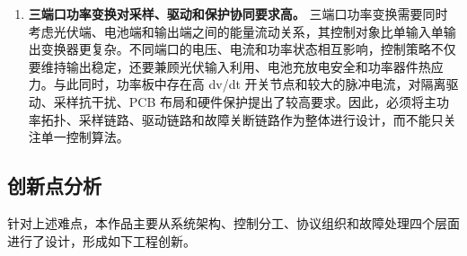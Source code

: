 \begin{enumerate}[label=\arabic*、, leftmargin=*, itemsep=0.8ex, parsep=0pt, topsep=0.5ex]
  \item \textbf{三端口功率变换对采样、驱动和保护协同要求高。}  
  三端口功率变换需要同时考虑光伏端、电池端和输出端之间的能量流动关系，其控制对象比单输入单输出变换器更复杂。不同端口的电压、电流和功率状态相互影响，控制策略不仅要维持输出稳定，还要兼顾光伏输入利用、电池充放电安全和功率器件热应力。与此同时，功率板中存在高 dv/dt 开关节点和较大的脉冲电流，对隔离驱动、采样抗干扰、PCB 布局和硬件保护提出了较高要求。因此，必须将主功率拓扑、采样链路、驱动链路和故障关断链路作为整体进行设计，而不能只关注单一控制算法。
\end{enumerate}

\subsection{创新点分析}

针对上述难点，本作品主要从系统架构、控制分工、协议组织和故障处理四个层面进行了设计，形成如下工程创新。

